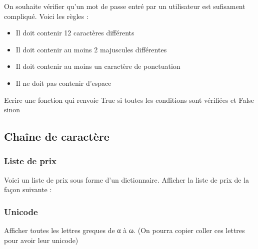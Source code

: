 \documentclass[letterpaper,10pt,english]{sphinxhowto}
\begin{document}
\sphinxAtStartPar
On souhaite vérifier qu’un mot de passe entré par un utilisateur est sufisament compliqué. Voici les règles :
\begin{itemize}
\item {} 
\sphinxAtStartPar
Il doit contenir 12 caractères différents

\item {} 
\sphinxAtStartPar
Il doit contenir au moins 2 majuscules différentes

\item {} 
\sphinxAtStartPar
Il doit contenir au moins un caractère de ponctuation 

\item {} 
\sphinxAtStartPar
Il ne doit pas contenir d’espace

\end{itemize}

\sphinxAtStartPar
Ecrire une fonction qui renvoie True si toutes les conditions sont vérifiées et False sinon


\subsection{Chaîne de caractère}
\label{\detokenize{cours4_chaine_caractere_exercices:chaine-de-caractere}}\label{\detokenize{cours4_chaine_caractere_exercices::doc}}

\subsubsection{Liste de prix}
\label{\detokenize{cours4_chaine_caractere_exercices:liste-de-prix}}
\sphinxAtStartPar
Voici un liste de prix sous forme d’un dictionnaire. Afficher la liste de prix de la façon suivante :



\begin{sphinxVerbatim}[commandchars=\\\{\}]
  
\end{sphinxVerbatim}


\subsubsection{Unicode}
\label{\detokenize{cours4_chaine_caractere_exercices:unicode}}
\sphinxAtStartPar
Afficher toutes les lettres greques de α à ω. (On pourra copier coller ces lettres pour avoir leur unicode)
\end{document}
